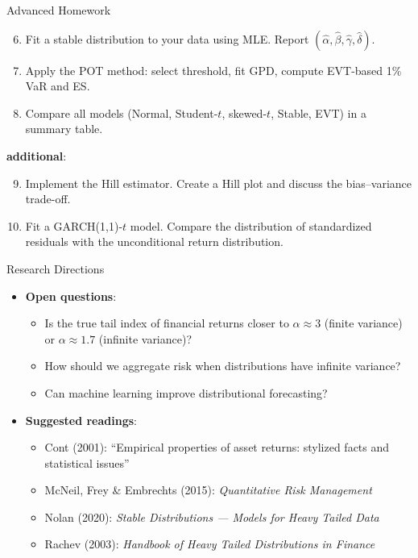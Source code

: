 \documentclass[9pt, aspectratio=169, t]{beamer}
\theoremstyle{definition}
\begin{document}
\begin{frame}{Advanced Homework}
\begin{enumerate}\setcounter{enumi}{5}
\item Fit a stable distribution to your data using MLE. Report $(\hat{\alpha}, \hat{\beta}, \hat{\gamma}, \hat{\delta})$.
\item Apply the POT method: select threshold, fit GPD, compute EVT-based 1\% VaR and ES.
\item Compare all models (Normal, Student-$t$, skewed-$t$, Stable, EVT) in a summary table.
\end{enumerate}

\vspace{0.3cm}
\textbf{additional}:
\begin{enumerate}\setcounter{enumi}{8}
\item Implement the Hill estimator. Create a Hill plot and discuss the bias--variance trade-off.
\item Fit a GARCH(1,1)-$t$ model. Compare the distribution of standardized residuals with the unconditional return distribution.
\end{enumerate}
\end{frame}

\begin{frame}{Research Directions}
\begin{itemize}
\item \textbf{Open questions}:
\begin{itemize}
\item Is the true tail index of financial returns closer to $\alpha \approx 3$ (finite variance) or $\alpha \approx 1.7$ (infinite variance)?
\item How should we aggregate risk when distributions have infinite variance?
\item Can machine learning improve distributional forecasting?
\end{itemize}
\item \textbf{Suggested readings}:
\begin{itemize}
\item Cont (2001): ``Empirical properties of asset returns: stylized facts and statistical issues''
\item McNeil, Frey \& Embrechts (2015): \textit{Quantitative Risk Management}
\item Nolan (2020): \textit{Stable Distributions --- Models for Heavy Tailed Data}
\item Rachev (2003): \textit{Handbook of Heavy Tailed Distributions in Finance}
\end{itemize}
\end{itemize}
\end{frame}
\end{document}
